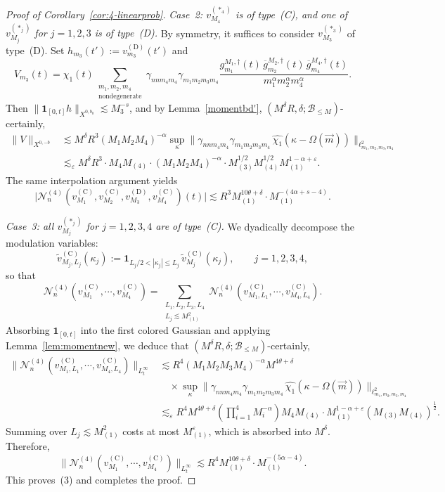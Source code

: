 \documentclass[11pt,reqno,english]{amsart}
\numberwithin{equation}{section}
\theoremstyle{plain}
\theoremstyle{definition}
\theoremstyle{remark}
\newcommand{\ov}{\overline}
\begin{document}
\begin{proof}[Proof of Corollary~\ref{cor:4-linearprob}]
	\emph{Case~2: $v_{M_4}^{(\ast_4)}$ is of type~(C), and one of $v_{M_j}^{(\ast_j)}$ for $j=1,2,3$ is of type~(D).}
	By symmetry, it suffices to consider $v_{M_3}^{(\ast_3)}$ of type~(D).
	Set $h_{m_3}(t'):=v_{m_3}^{(\mathrm{D})}(t')$ and
	\[
	V_{m_3}(t)
	=
	\chi_1(t)
	\sum_{\substack{m_1,m_2,m_4\\ \text{nondegenerate}}}
	\gamma_{nnm_4m_4}\gamma_{m_1m_2m_3m_4}
	\frac{g_{m_1}^{M_1,\dag}(t)\,\ov{g}_{m_2}^{M_2,\dag}(t)\,\ov{g}_{m_4}^{M_4,\dag}(t)}
	{m_1^\alpha m_2^\alpha m_4^\alpha}.
	\]
	Then $\|\mathbf{1}_{[0,t]}h\|_{X^{0,b_0}}\lesssim M_3^{-s}$,
	and by Lemma~\ref{momentbd'}, $(M^\delta R,\delta;\mathcal{B}_{\le M})$-certainly,
	\begin{align*}
		\|V\|_{X^{0,-b}}
		&\lesssim
		M^\delta R^3 (M_1 M_2 M_4)^{-\alpha}
		\sup_{\kappa}\|\gamma_{nnm_4m_4}\gamma_{m_1m_2m_3m_4}\,\widehat{\chi_1}(\kappa-\Omega(\vec m))\|_{\ell_{m_1,m_2,m_3,m_4}^2}\\
		&\lesssim_{\varepsilon}
		M^\delta R^3\cdot M_4 M_{(4)}\cdot (M_1 M_2 M_4)^{-\alpha}
		\cdot M_{(3)}^{1/2}M_{(4)}^{1/2}M_{(1)}^{1-\alpha+\varepsilon}.
	\end{align*}
	The same interpolation argument yields
	\[
	\big|\mathcal{N}_n^{(4)}(v_{M_1}^{(\mathrm{C})},v_{M_2}^{(\mathrm{C})},v_{M_3}^{(\mathrm{D})},v_{M_4}^{(\mathrm{C})})(t)\big|
	\lesssim
	R^3 M_{(1)}^{10\theta+\delta}\cdot M_{(1)}^{-(4\alpha+s-4)}.
	\]

	\emph{Case~3: all $v_{M_j}^{(\ast_j)}$ for $j=1,2,3,4$ are of type~(C).}
	We dyadically decompose the modulation variables:
	\[
	\widetilde{v}_{M_j,L_j}^{(\mathrm{C})}(\kappa_j)
	:=
	\mathbf{1}_{L_j/2<|\kappa_j|\leq L_j}\,\widetilde{v}_{M_j}^{(\mathrm{C})}(\kappa_j),
	\qquad j=1,2,3,4,
	\]
	so that
	\[
	\mathcal{N}_n^{(4)}(v_{M_1}^{(\mathrm{C})},\cdots,v_{M_4}^{(\mathrm{C})})
	=
	\sum_{\substack{L_1,L_2,L_3,L_4\\ L_j\lesssim M_{(1)}^2}}
	\mathcal{N}_n^{(4)}(v_{M_1,L_1}^{(\mathrm{C})},\cdots,v_{M_4,L_4}^{(\mathrm{C})}).
	\]
	Absorbing $\mathbf{1}_{[0,t]}$ into the first colored Gaussian and applying Lemma~\ref{lem:momentnew}, we deduce that $(M^\delta R,\delta;\mathcal{B}_{\le M})$-certainly,
	\begin{align*}
		\big\|\mathcal{N}_n^{(4)}(v_{M_1,L_1}^{(\mathrm{C})},\cdots,v_{M_4,L_4}^{(\mathrm{C})})\big\|_{L_t^\infty}
		&\lesssim
		R^4(M_1 M_2 M_3 M_4)^{-\alpha}M^{4\theta+\delta}\\
		&\quad\times\sup_{\kappa}
		\|\gamma_{nnm_4m_4}\gamma_{m_1m_2m_3m_4}\,\widehat{\chi_1}(\kappa-\Omega(\vec m))\|_{\ell_{m_1,m_2,m_3,m_4}^2}\\
		&\lesssim_{\varepsilon}
		R^4 M^{4\theta+\delta}\left(\prod_{i=1}^{4}M_{i}^{-\alpha}\right)M_4 M_{(4)}
		\cdot M_{(1)}^{1-\alpha+\varepsilon}(M_{(3)}M_{(4)})^{\frac12}.
	\end{align*}
	Summing over $L_j\lesssim M_{(1)}^2$ costs at most $M_{(1)}^\varepsilon$, which is absorbed into $M^\delta$. Therefore,
	\[
	\|\mathcal{N}_n^{(4)}(v_{M_1}^{(\mathrm{C})},\cdots,v_{M_4}^{(\mathrm{C})})\|_{L_t^\infty}
	\lesssim
	R^4 M_{(1)}^{10\theta+\delta}\cdot M_{(1)}^{-(5\alpha-4)}.
	\]
	This proves~(3) and completes the proof.
\end{proof}
	
\end{document}

